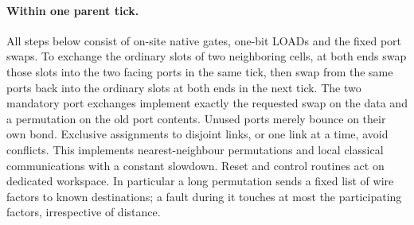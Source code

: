 \paragraph{Within one parent tick.}

All steps below consist of on-site native gates, one-bit LOADs and the fixed port swaps. To exchange the ordinary slots of two neighboring cells, at both ends swap those slots into the two facing ports in the same tick, then swap from the same ports back into the ordinary slots at both ends in the next tick. The two mandatory port exchanges implement exactly the requested swap on the data and a permutation on the old port contents. Unused ports merely bounce on their own bond. Exclusive assignments to disjoint links, or one link at a time, avoid conflicts. This implements nearest-neighbour permutations and local classical communications with a constant slowdown. Reset and control routines act on dedicated workspace. In particular a long permutation sends a fixed list of wire factors to known destinations; a fault during it touches at most the participating factors, irrespective of distance.

